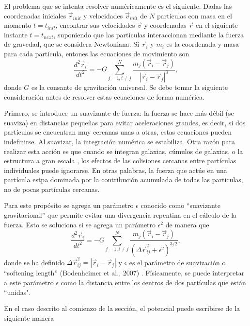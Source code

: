 \documentclass[a4paper,openright,12pt]{book}
\begin{document}
El problema que se intenta resolver numéricamente es el siguiente. Dadas las coordenadas iniciales $\vec{r}_{init}$ y velocidades $\vec{v}_{init}$ de $N$ partículas con masa en el momento $t = t_{init}$, encontrar sus velocidades $\vec{v}$ y coordenadas $\vec{r}$ en el siguiente instante $t = t_{next}$, suponiendo que las partículas interaccionan mediante la fuerza de gravedad, que se considera Newtoniana. Si $\vec{r}_{i}$ y $m_{i}$ es la coordenada y masa para cada partícula, entones las ecuaciones de movimiento son
\begin{equation}
\frac{d^{2}\vec{r}_{i}}{d t^{2}}=
-G \sum_{j=1, i \not= j}^{N} \frac{m_{j}(\vec{r}_{i}-\vec{r}_{j})}{|\vec{r}_{i}-\vec{r}_{j}|^{3}}, \label{eqn 2.8}
\end{equation}
donde $G$ es la consante de gravitación universal. Se debe tomar la siguiente consideración antes de resolver estas ecuaciones de forma numérica.

Primero, se introduce un suavizante de fuerza: la fuerza se hace más débil (se suaviza) en distancias pequeñas para evitar aceleraciones grandes, es decir, si dos partículas se encuentran muy cercanas unas a otras, estas ecuaciones pueden indefinirse. Al suavizar, la integración numérica se estabiliza. Otra razón para realizar esta acción es que cuando se integran galaxias, cúmulos de galaxias, o la estructura a gran escala , los efectos de las colisiones cercanas entre partículas individuales puede ignorarse. En otras palabras, la fuerza que actúe en una partícula estpa dominada por la contribución acumulada de todas las partículas, no de pocas partículas cercanas.


Para este propósito se agrega un parámetro $\epsilon$ conocido como “suavizante gravitacional” que permite evitar una divergencia repentina en el cálculo de la fuerza. Esto se soluciona si se agrega un parámetro $\epsilon^{2}$ de manera que 
\begin{equation}
\frac{d^{2}\vec{r}_{i}}{d t^{2}}=
-G \sum_{j=1, i \not= j}^{N} \frac{m_{j}(\vec{r}_{i}-\vec{r}_{j})}{(\Delta\vec{r}_{ij}^{2} + \epsilon^{2})^{3/2}},\label{eqn2.7}
\end{equation} 
donde se ha definido $\Delta\vec{r}_{ij}^{2} = |\vec{r}_{i} - \vec{r}_{j}|$ y $\epsilon$ es el parámetro de suavización o “softening length” (Bodenheimer et al., 2007) \cite{b5}. Físicamente, se puede interpretar a este parámetro $\epsilon$ como la distancia entre los centros de dos partículas que están “unidas".

En el caso descrito al comienzo de la sección, el potencial puede escribirse de la siguiente manera
\end{document}
